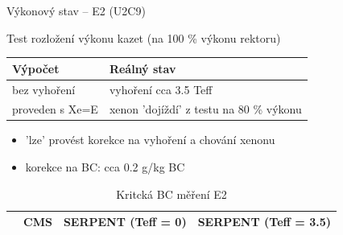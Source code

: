 \documentclass{beamer}
\begin{document}
\begin{frame}{Výkonový stav -- E2 (U2C9)}

\begin{block}{}\small
	Test rozložení výkonu kazet (na 100 \% výkonu rektoru)
\end{block}

\begin{table}[h]\scriptsize
	\begin{center}
		\begin{tabular}{ll}
Výpočet & Reálný stav \\			
			\toprule
bez vyhoření & vyhoření cca 3.5 Teff \\
proveden s Xe=E & xenon 'dojíždí' z testu na 80 \% výkonu \\
			\bottomrule
		\end{tabular}
	\end{center}
\end{table}

\begin{itemize}\footnotesize
	\item 'lze' provést korekce na vyhoření a chování xenonu
	\item korekce na BC: cca 0.2 g/kg BC

\end{itemize}
	
\begin{table}[h]\scriptsize
	\begin{center}
		\begin{tabular}{cccc}
			\toprule
			& CMS    & SERPENT (\tiny Teff = 0) & SERPENT (\tiny Teff = 3.5) \\
			\midrule
			
			\bottomrule
		\end{tabular}
		\caption{\footnotesize Kritcká BC měření E2}
	\end{center}
\end{table}
\end{frame}
\end{document}

